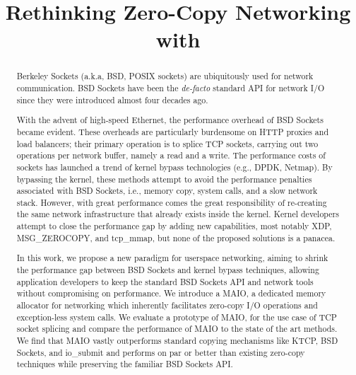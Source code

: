 \documentclass[sigconf,9pt]{acmart}
\title{Rethinking Zero-Copy Networking with \oursys}
\newcommand{\oursys}{MAIO\xspace}
\newcommand{\sockets}{BSD Sockets\xspace}
\begin{document}
\begin{abstract}
    Berkeley Sockets (a.k.a, BSD, POSIX sockets) are ubiquitously used for network communication. \sockets have been the \emph{de-facto} standard API for network I/O since they were introduced almost four decades ago. 
    
    With the advent of high-speed Ethernet, the performance overhead of \sockets became evident. These overheads are particularly burdensome on HTTP proxies and load balancers; their primary operation is to splice TCP sockets, carrying out two operations per network buffer, namely a read and a write. The performance costs of sockets has launched a trend of kernel bypass technologies (e.g., DPDK, Netmap). By bypassing the kernel, these methods attempt to avoid the performance penalties associated with \sockets, i.e., memory copy, system calls, and a slow network stack. However, with great performance comes the great responsibility of re-creating the same network infrastructure that already exists inside the kernel. Kernel developers attempt to close the performance gap by adding new capabilities, most notably XDP, MSG\_ZEROCOPY, and tcp\_mmap, but none of the proposed solutions is a panacea.
    
    In this work, we propose a new paradigm for userspace networking, aiming to shrink the performance gap between \sockets and kernel bypass techniques, allowing application developers to keep the standard \sockets API and network tools without compromising on performance. We introduce a \oursys, a dedicated memory allocator for networking which inherently facilitates zero-copy I/O operations and exception-less system calls. We evaluate a prototype of \oursys, for the use case of TCP socket splicing and compare the performance of \oursys to the state of the art methods. We find that \oursys vastly outperforms standard copying mechanisms like KTCP, \sockets, and io\_submit and performs on par or better than existing zero-copy techniques while preserving the familiar \sockets API. 
    
\end{abstract}

\maketitle
\sloppypar




\end{document}
